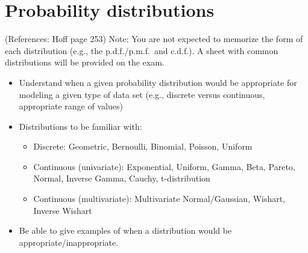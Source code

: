 \documentclass[12pt]{article}
\begin{document}
\section{Probability distributions}
(References: Hoff page 253)
Note: You are not expected to memorize the form of each distribution (e.g., the p.d.f./p.m.f.\ and c.d.f.).  A sheet with common distributions will be provided on the exam.
\begin{itemize}
\setlength\itemsep{0em}
\item Understand when a given probability distribution would be appropriate for modeling a given type of data set (e.g., discrete versus continuous, appropriate range of values)
\item Distributions to be familiar with: 
\begin{itemize}
\item Discrete: Geometric, Bernoulli, Binomial, Poisson, Uniform
\item Continuous (univariate): Exponential, Uniform, Gamma, Beta, Pareto, Normal, Inverse Gamma, Cauchy, t-distribution
\item Continuous (multivariate): Multivariate Normal/Gaussian, Wishart, Inverse Wishart
\end{itemize}
\item Be able to give examples of when a distribution would be appropriate/inappropriate.
\end{itemize}

  
\end{document}

